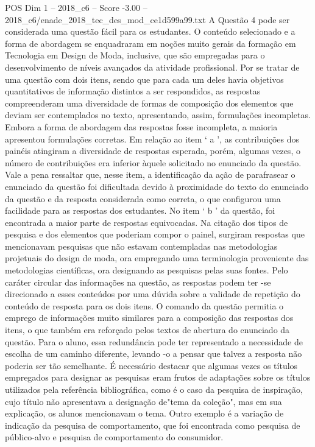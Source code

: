 \begin{textsample}{POS Dim 1 – 2018\_c6 – Score -3.00 – 2018\_c6/enade\_2018\_tec\_des\_mod\_ce1d599a99.txt}
A Questão 4 pode ser considerada uma questão fácil para os estudantes.
O conteúdo selecionado e a forma de abordagem se enquadraram em noções muito gerais da formação em Tecnologia em Design de Moda, inclusive, que são empregadas para o desenvolvimento de níveis avançados da atividade profissional.
Por se tratar de uma questão com dois itens, sendo que para cada um deles havia objetivos quantitativos de informação distintos a ser respondidos, as respostas compreenderam uma diversidade de formas de composição dos elementos que deviam ser contemplados no texto, apresentando, assim, formulações incompletas.
Embora a forma de abordagem das respostas fosse incompleta, a maioria apresentou formulações corretas.
Em relação ao item ‘ a ’, as contribuições dos painéis atingiram a diversidade de respostas esperada, porém, algumas vezes, o número de contribuições era inferior àquele solicitado no enunciado da questão.
Vale a pena ressaltar que, nesse item, a identificação da ação de parafrasear o enunciado da questão foi dificultada devido à proximidade do texto do enunciado da questão e da resposta considerada como correta, o que configurou uma facilidade para as respostas dos estudantes.
No item ‘ b ’ da questão, foi encontrada a maior parte de respostas equivocadas.
Na citação dos tipos de pesquisa e dos elementos que poderiam compor o painel, surgiram respostas que mencionavam pesquisas que não estavam contempladas nas metodologias projetuais do design de moda, ora empregando uma terminologia proveniente das metodologias científicas, ora designando as pesquisas pelas suas fontes.
Pelo caráter circular das informações na questão, as respostas podem ter -se direcionado a esses conteúdos por uma dúvida sobre a validade de repetição do conteúdo de resposta para os dois itens.
O comando da questão permitia o emprego de informações muito similares para a composição das respostas dos itens, o que também era reforçado pelos textos de abertura do enunciado da questão.
Para o aluno, essa redundância pode ter representado a necessidade de escolha de um caminho diferente, levando -o a pensar que talvez a resposta não poderia ser tão semelhante.
É necessário destacar que algumas vezes os títulos empregados para designar as pesquisas eram frutos de adaptações sobre os títulos utilizados pela referência bibliográfica, como é o caso da pesquisa de inspiração, cujo título não apresentava a designação de"tema da coleção", mas em sua explicação, os alunos mencionavam o tema.
Outro exemplo é a variação de indicação da pesquisa de comportamento, que foi encontrada como pesquisa de público-alvo e pesquisa de comportamento do consumidor.

\end{textsample}
